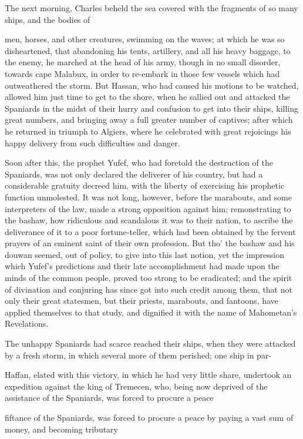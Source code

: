 \documentclass{article}
\begin{document}
The next morning, Charles beheld the sea covered with the fragments of so many ships, and the bodies of

men, horses, and other creatures, swimming on the waves; at which he was so disheartened, that abandoning his tents, artillery, and all his heavy baggage, to the enemy, he marched at the head of his army, though in no small disorder, towards cape Malabux, in order to re-embark in those few vessels which had outweathered the storm. But Hassan, who had caused his motions to be watched, allowed him just time to get to the shore, when he sallied out and attacked the Spaniards in the midst of their hurry and confusion to get into their ships, killing great numbers, and bringing away a full greater number of captives; after which he returned in triumph to Algiers, where he celebrated with great rejoicings his happy delivery from such difficulties and danger.

Soon after this, the prophet Yufef, who had foretold the destruction of the Spaniards, was not only declared the deliverer of his country, but had a considerable gratuity decreed him, with the liberty of exercising his prophetic function unmolested. It was not long, however, before the marabouts, and some interpreters of the law, made a strong opposition against him; remonstrating to the bashaw, how ridiculous and scandalous it was to their nation, to ascribe the deliverance of it to a poor fortune-teller, which had been obtained by the fervent prayers of an eminent saint of their own profession. But tho' the bashaw and his douwan seemed, out of policy, to give into this last notion, yet the impression which Yufef's predictions and their late accomplishment had made upon the minds of the common people, proved too strong to be eradicated; and the spirit of divination and conjuring has since got into such credit among them, that not only their great statesmen, but their priests, marabouts, and fantoons, have applied themselves to that study, and dignified it with the name of Mahometan's Revelations.

The unhappy Spaniards had scarce reached their ships, when they were attacked by a fresh storm, in which several more of them perished; one ship in par-

Haffan, elated with this victory, in which he had very little share, undertook an expedition against the king of Tremecen, who, being now deprived of the assistance of the Spaniards, was forced to procure a peace

fiftance of the Spaniards, was forced to procure a peace by paying a vast sum of money, and becoming tributary
\end{document}
